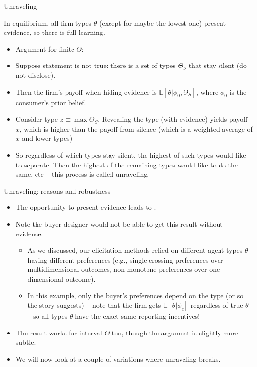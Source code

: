 \documentclass[english,10pt
,aspectratio=169
]{beamer}
\begin{document}
\begin{frame}{Unraveling}
	\begin{theorem}[Unraveling]
		In equilibrium, all firm types $\theta$ (except for maybe the lowest one) present evidence, so there is full learning.
	\end{theorem}
	\begin{itemize}[<+->]
		\item Argument for finite $\Theta$:
		\item Suppose statement is not true: there is a set of types $\Theta_S$ that stay silent (do not disclose).
		\item Then the firm's payoff when hiding evidence is $\mathbb{E}[\theta | \phi_0, \Theta_S]$, where $\phi_0$ is the consumer's prior belief.
		\item Consider type $z \equiv \max \Theta_S$. Revealing the type (with evidence) yields payoff $x$, which is higher than the payoff from silence (which is a weighted average of $x$ and lower types).
		\item So regardless of which types stay silent, the highest of such types would like to separate. Then the highest of the remaining types would like to do the same, etc -- this process is called \alert{unraveling}.
	\end{itemize}
\end{frame}


\begin{frame}{Unraveling: reasons and robustness}
	\begin{itemize}
		\item The opportunity to present evidence leads to .
		\item Note the buyer-designer would \alert{not be able} to get this result \alert{without evidence}:
		\begin{itemize}
			\item As we discussed, our elicitation methods relied on different agent types $\theta$ having different preferences (e.g., single-crossing preferences over multidimensional outcomes, non-monotone preferences over one-dimensional outcome).
			
			\item In this example, only the buyer's preferences depend on the type (or so the story suggests) -- note that the firm gets $\mathbb{E}[\theta | \phi_c]$ regardless of true $\theta$ -- so all types $\theta$ have the exact same reporting incentives! 
		\end{itemize}
		\pause
		\item The result works for interval $\Theta$ too, though the argument is slightly more subtle. 
		\item We will now look at a couple of variations where unraveling \alert{breaks}.
	\end{itemize}
\end{frame}
\end{document}
